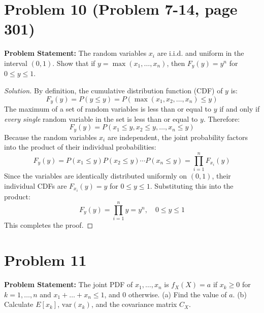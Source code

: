\documentclass{article}
\begin{document}
\section*{Problem 10 (Problem 7-14, page 301)}
\textbf{Problem Statement:}
The random variables $x_i$ are i.i.d. and uniform in the interval $(0, 1)$. Show that if $y = \max(x_1, \dots, x_n)$, then $F_y(y) = y^n$ for $0 \le y \le 1$.

\begin{proof}[Solution]
	By definition, the cumulative distribution function (CDF) of $y$ is:
	\[
		F_y(y) = P(y \le y) = P(\max(x_1, x_2, \dots, x_n) \le y)
	\]
	The maximum of a set of random variables is less than or equal to $y$ if and only if \textit{every single} random variable in the set is less than or equal to $y$. Therefore:
	\[
		F_y(y) = P(x_1 \le y, x_2 \le y, \dots, x_n \le y)
	\]
	Because the random variables $x_i$ are independent, the joint probability factors into the product of their individual probabilities:
	\[
		F_y(y) = P(x_1 \le y) P(x_2 \le y) \cdots P(x_n \le y) = \prod_{i=1}^{n} F_{x_i}(y)
	\]
	Since the variables are identically distributed uniformly on $(0, 1)$, their individual CDFs are $F_{x_i}(y) = y$ for $0 \le y \le 1$.
	Substituting this into the product:
	\[
		F_y(y) = \prod_{i=1}^{n} y = y^n, \quad 0 \le y \le 1
	\]
	This completes the proof.
\end{proof}

\section*{Problem 11}
\textbf{Problem Statement:}
The joint PDF of $x_1, \dots, x_n$ is $f_X(X) = a$ if $x_k \ge 0$ for $k=1,\dots,n$ and $x_1 + \dots + x_n \le 1$, and $0$ otherwise.
(a) Find the value of $a$.
(b) Calculate $E[x_k]$, $\text{var}(x_k)$, and the covariance matrix $C_X$.
\end{document}
